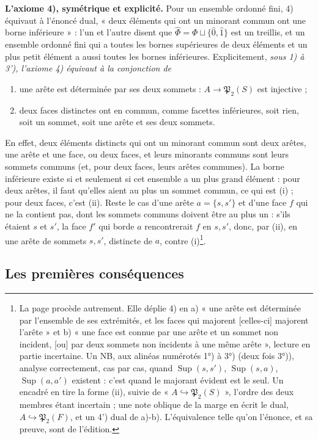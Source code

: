 \documentclass[11pt,a4paper]{article}
\begin{document}
\textbf{L'axiome 4), symétrique et explicité.} Pour un ensemble ordonné fini,
4) équivaut à l'énoncé dual, « deux éléments qui ont un minorant commun ont
une borne inférieure » : l'un et l'autre disent que $\widehat{\Phi} = \Phi \sqcup
\{\hat 0, \hat 1\}$ est un treillis, et un ensemble ordonné fini qui a toutes
les bornes supérieures de deux éléments et un plus petit élément a aussi toutes
les bornes inférieures. Explicitement, \emph{sous 1) à 3'), l'axiome 4)
équivaut à la conjonction de}
\begin{enumerate}
  \item[(i)] une arête est déterminée par ses deux sommets : $A \to
    \mathfrak{P}_2(S)$ est injective ;
  \item[(ii)] deux faces distinctes ont en commun, comme facettes inférieures,
    soit rien, soit un sommet, soit une arête et ses deux sommets.
\end{enumerate}
En effet, deux éléments distincts qui ont un minorant commun sont deux arêtes,
une arête et une face, ou deux faces, et leurs minorants communs sont leurs
sommets communs (et, pour deux faces, leurs arêtes communes). La borne
inférieure existe si et seulement si cet ensemble a un plus grand élément :
pour deux arêtes, il faut qu'elles aient au plus un sommet commun, ce qui est
(i) ; pour deux faces, c'est (ii). Reste le cas d'une arête $a = \{s, s'\}$ et
d'une face $f$ qui ne la contient pas, dont les sommets communs doivent être
au plus un : s'ils étaient $s$ et $s'$, la face $f'$ qui borde $a$ rencontrerait
$f$ en $s, s'$, donc, par (ii), en une arête de sommets $s, s'$, distincte de
$a$, contre (i)\footnote{La page procède autrement. Elle déplie 4) en a) « une
arête est déterminée par l'ensemble de ses extrémités, et les faces qui
majorent [celles-ci] majorent l'arête » et b) « une face est connue par une
arête et un sommet non incident, [ou] par deux sommets non incidents à une
même arête », lecture en partie incertaine. Un NB, aux alinéas numérotés 1°)
à 3°) (deux fois 3°)), analyse correctement, cas par cas, quand
$\operatorname{Sup}(s, s')$, $\operatorname{Sup}(s, a)$,
$\operatorname{Sup}(a, a')$ existent : c'est quand le majorant évident est le
seul. Un encadré en tire la forme (ii), suivie de « $A \hookrightarrow
\mathfrak{P}_2(S)$ », l'ordre des deux membres étant incertain ; une note
oblique de la marge en écrit le dual, $A \hookrightarrow \mathfrak{P}_2(F)$,
et un 4') dual de a)-b). L'équivalence telle qu'on l'énonce, et sa preuve,
sont de l'édition.}.

\subsection*{Les premières conséquences}
\end{document}
